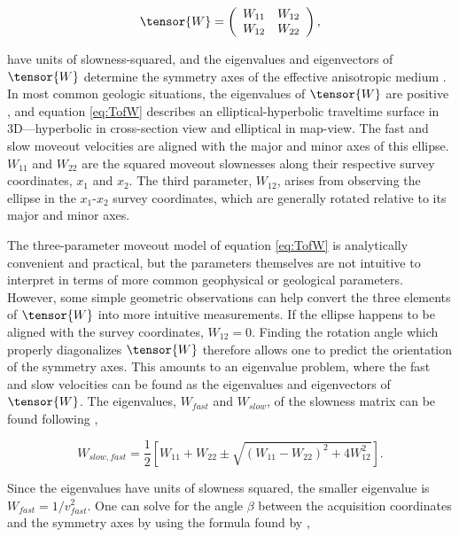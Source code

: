 \begin{equation}
\label{eq:Wmatrix}
\tensor{W}=\left(
\begin{array}{cc}
 W_{11} & W_{12} \\
 W_{12} & W_{22}
\end{array}
\right),
\end{equation}

\noindent have units of slowness-squared, and the eigenvalues and eigenvectors of $\tensor{W}$ determine the symmetry axes of the effective anisotropic medium \cite[]{GEO63-03-10791092}. 
In most common geologic situations, the eigenvalues of $\tensor{W}$ are positive \cite[]{tsvankin05}, and equation \ref{eq:TofW} describes an elliptical-hyperbolic traveltime surface in 3D---hyperbolic in cross-section view and elliptical in map-view.
 The fast and slow moveout velocities are aligned with the major and minor axes of this ellipse. 
$W_{11}$ and $W_{22}$ are the squared moveout slownesses along their respective survey coordinates, $x_1$ and $x_2$.
 The third parameter, $W_{12}$, arises from observing the ellipse in the $x_1$-$x_2$ survey coordinates, which are generally rotated relative to its major and minor axes.  

The three-parameter moveout model of equation \ref{eq:TofW} is analytically convenient and practical, but the parameters themselves are not intuitive to interpret in terms of more common geophysical or geological parameters.
However, some simple geometric observations can help convert the three elements of $\tensor{W}$ into more intuitive measurements.
If the ellipse happens to be aligned with the survey coordinates, $W_{12}=0$. 
Finding the rotation angle which properly diagonalizes $\tensor{W}$ therefore allows one to predict the orientation of the symmetry axes.  
This amounts to an eigenvalue problem, where the fast and slow velocities can be found as the eigenvalues and eigenvectors of $\tensor{W}$.   
The eigenvalues, $W_{fast}$ and $W_{slow}$, of the slowness matrix can be found following \cite{GEO63-03-10791092},

\begin{equation}
\label{eq:lambda}
W_{slow,fast}=\frac{1}{2}\left[ W_{11}+W_{22}\pm \sqrt{(W_{11}-W_{22})^2+4W_{12}^2}\right].
\end{equation}

\noindent Since the eigenvalues have units of slowness squared, the smaller eigenvalue is $W_{fast}=1/v_{fast}^2$.
One can solve for the angle $\beta $ between the acquisition coordinates and the symmetry axes by using the formula found by \cite{GEO63-03-10791092},

